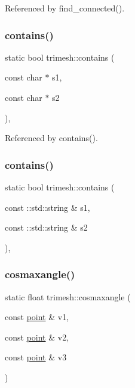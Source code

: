 Referenced by find\+\_\+connected().

\mbox{\label{namespacetrimesh_a03a8fbb8c2653c41949c89365b11b720}} 
\subsubsection{\texorpdfstring{contains()}{contains()}\hspace{0.1cm}{\footnotesize\ttfamily [1/2]}}
{\footnotesize\ttfamily static bool trimesh\+::contains (\begin{DoxyParamCaption}\item[{const char $\ast$}]{s1,  }\item[{const char $\ast$}]{s2 }\end{DoxyParamCaption})\hspace{0.3cm}{\ttfamily [inline]}, {\ttfamily [static]}}



Referenced by contains().

\mbox{\label{namespacetrimesh_a3ebcac5989433e31b67168091cc66062}} 
\subsubsection{\texorpdfstring{contains()}{contains()}\hspace{0.1cm}{\footnotesize\ttfamily [2/2]}}
{\footnotesize\ttfamily static bool trimesh\+::contains (\begin{DoxyParamCaption}\item[{const \+::std\+::string \&}]{s1,  }\item[{const \+::std\+::string \&}]{s2 }\end{DoxyParamCaption})\hspace{0.3cm}{\ttfamily [inline]}, {\ttfamily [static]}}

\mbox{\label{namespacetrimesh_af5553d80525773f785259b1198c0da70}} 
\subsubsection{\texorpdfstring{cosmaxangle()}{cosmaxangle()}}
{\footnotesize\ttfamily static float trimesh\+::cosmaxangle (\begin{DoxyParamCaption}\item[{const \hyperlink{namespacetrimesh_a325b99fd6454b22fa4c4bc3223271b2c}{point} \&}]{v1,  }\item[{const \hyperlink{namespacetrimesh_a325b99fd6454b22fa4c4bc3223271b2c}{point} \&}]{v2,  }\item[{const \hyperlink{namespacetrimesh_a325b99fd6454b22fa4c4bc3223271b2c}{point} \&}]{v3 }\end{DoxyParamCaption})\hspace{0.3cm}{\ttfamily [static]}}



